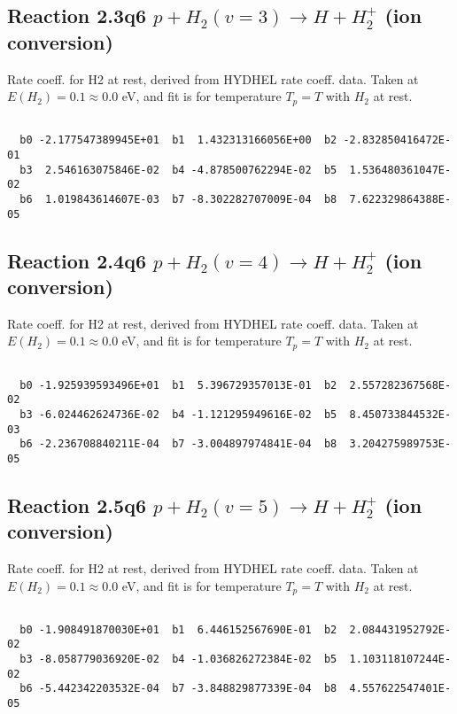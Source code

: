\newpage
\subsection{
Reaction 2.3q6
$ p + H_2(v=3) \rightarrow H + H_2^+$ (ion conversion)
}
Rate coeff. for H2 at rest, derived from HYDHEL rate coeff. data.
Taken at $E(H_2) = 0.1 \approx 0.0$ eV,  and fit is for temperature $T_p=T$ with $H_2$ at rest.

\begin{small}\begin{verbatim}

  b0 -2.177547389945E+01  b1  1.432313166056E+00  b2 -2.832850416472E-01
  b3  2.546163075846E-02  b4 -4.878500762294E-02  b5  1.536480361047E-02
  b6  1.019843614607E-03  b7 -8.302282707009E-04  b8  7.622329864388E-05

\end{verbatim}\end{small}

\newpage
\subsection{
Reaction 2.4q6
$ p + H_2(v=4) \rightarrow H + H_2^+$ (ion conversion)
}
Rate coeff. for H2 at rest, derived from HYDHEL rate coeff. data.
Taken at $E(H_2) = 0.1 \approx 0.0$ eV,  and fit is for temperature $T_p=T$ with $H_2$ at rest.

\begin{small}\begin{verbatim}

  b0 -1.925939593496E+01  b1  5.396729357013E-01  b2  2.557282367568E-02
  b3 -6.024462624736E-02  b4 -1.121295949616E-02  b5  8.450733844532E-03
  b6 -2.236708840211E-04  b7 -3.004897974841E-04  b8  3.204275989753E-05

\end{verbatim}\end{small}

\newpage
\subsection{
Reaction 2.5q6
$ p + H_2(v=5) \rightarrow H + H_2^+$ (ion conversion)
}
Rate coeff. for H2 at rest, derived from HYDHEL rate coeff. data.
Taken at $E(H_2) = 0.1 \approx 0.0$ eV,  and fit is for temperature $T_p=T$ with $H_2$ at rest.

\begin{small}\begin{verbatim}

  b0 -1.908491870030E+01  b1  6.446152567690E-01  b2  2.084431952792E-02
  b3 -8.058779036920E-02  b4 -1.036826272384E-02  b5  1.103118107244E-02
  b6 -5.442342203532E-04  b7 -3.848829877339E-04  b8  4.557622547401E-05

\end{verbatim}\end{small}

